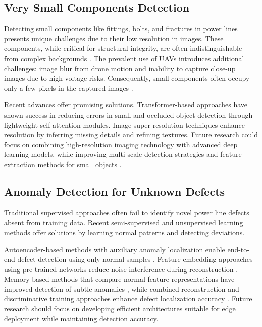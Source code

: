 \subsection{Very Small Components Detection}
Detecting small components like fittings, bolts, and fractures in power lines presents unique challenges due to their low resolution in images. These components, while critical for structural integrity, are often indistinguishable from complex backgrounds \cite{xiao_detection_2021}. The prevalent use of UAVs introduces additional challenges: image blur from drone motion and inability to capture close-up images due to high voltage risks. Consequently, small components often occupy only a few pixels in the captured images \cite{zhai_hybrid_2021}.

Recent advances offer promising solutions. Transformer-based approaches \cite{dong_improved_2023} have shown success in reducing errors in small and occluded object detection through lightweight self-attention modules. Image super-resolution techniques \cite{ledig2017photo} enhance resolution by inferring missing details and refining textures. Future research could focus on combining high-resolution imaging technology with advanced deep learning models, while improving multi-scale detection strategies and feature extraction methods for small objects \cite{hu2018small}.

\subsection{Anomaly Detection for Unknown Defects}
Traditional supervised approaches often fail to identify novel power line defects absent from training data. Recent semi-supervised and unsupervised learning methods \cite{defard2021padim, batzner2024efficientad} offer solutions by learning normal patterns and detecting deviations.

Autoencoder-based methods with auxiliary anomaly localization enable end-to-end defect detection using only normal samples \cite{tsai2021autoencoder, sun2023semisupervised}. Feature embedding approaches using pre-trained networks reduce noise interference during reconstruction \cite{roth2022towards}. Memory-based methods that compare normal feature representations have improved detection of subtle anomalies \cite{yang2023memseg}, while combined reconstruction and discriminative training approaches enhance defect localization accuracy \cite{zavrtanik2021draem}. Future research should focus on developing efficient architectures suitable for edge deployment while maintaining detection accuracy.
